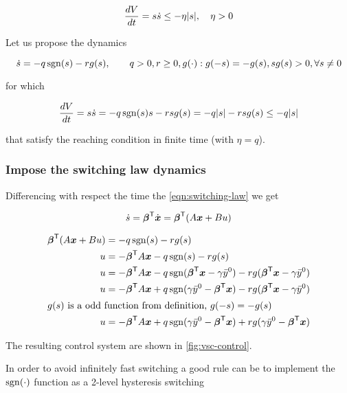 \[
    \frac{d V}{d t} = s \dot s \leq - \eta |s|, \quad \eta > 0
\]

Let us propose the dynamics

\[
    \dot s = -q \operatorname{sgn}(s) - r g(s), \qquad q> 0, r \geq 0, g(\cdot) : g(-s)=-g(s), sg(s) > 0, \forall s \neq 0
\]

for which

\[
    \frac{d V}{d t} = s \dot s = -q \operatorname{sgn}(s) s - r s g(s) = -q |s| - r s g(s) \leq - q |s|
\]

that satisfy the reaching condition in finite time (with $\eta = q$).

\subsubsection{Impose the switching law dynamics}

Differencing with respect the time the \cref{eqn:switching-law} we get

\[
    \dot s = \boldsymbol{\beta}^{\mathsf{T}} \dot{\boldsymbol{x}} = \boldsymbol{\beta}^{\mathsf{T}} (A \boldsymbol{x} + B u)
\]

\begin{align*}
    \boldsymbol{\beta}^{\mathsf{T}} (A \boldsymbol{x} + B u) &= -q \operatorname{sgn}(s) - r g(s) \\
    u &= - \boldsymbol{\beta}^{\mathsf{T}} A \boldsymbol{x} -q \operatorname{sgn}(s) - r g(s) \\
    u &= - \boldsymbol{\beta}^{\mathsf{T}} A \boldsymbol{x} -q \operatorname{sgn}(\boldsymbol{\beta}^{\mathsf{T}} \boldsymbol{x} - \gamma \bar y^0) - r g(\boldsymbol{\beta}^{\mathsf{T}} \boldsymbol{x} - \gamma \bar y^0) \\
    u &= - \boldsymbol{\beta}^{\mathsf{T}} A \boldsymbol{x} + q \operatorname{sgn}(\gamma \bar y^0 - \boldsymbol{\beta}^{\mathsf{T}} \boldsymbol{x}) - r g(\boldsymbol{\beta}^{\mathsf{T}} \boldsymbol{x} - \gamma \bar y^0) \\
    \intertext{$g(s)$ is a odd function from definition, $g(-s)=-g(s)$}
    u &= - \boldsymbol{\beta}^{\mathsf{T}} A \boldsymbol{x} + q \operatorname{sgn}(\gamma \bar y^0 - \boldsymbol{\beta}^{\mathsf{T}} \boldsymbol{x}) + r g(\gamma \bar y^0 - \boldsymbol{\beta}^{\mathsf{T}} \boldsymbol{x})
\end{align*}

The resulting control system are shown in \cref{fig:vsc-control}.

\begin{nb}In order to avoid infinitely fast switching a good rule can be to implement the $\operatorname{sgn}(\cdot)$ function as a 2-level hysteresis switching\end{nb}

